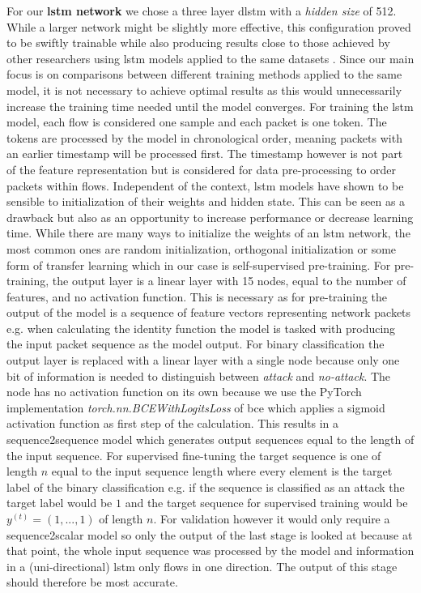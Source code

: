 For our \textbf{\gls{lstm} network} we chose a three layer \gls{dlstm} with a \textit{hidden size} of 512. While a larger network might be slightly more effective, this configuration proved to be swiftly trainable while also producing results close to those achieved by other researchers using \gls{lstm} models applied to the same datasets \cite{fog_based_detection_survey_2020}. Since our main focus is on comparisons between different training methods applied to the same model, it is not necessary to achieve optimal results as this would unnecessarily increase the training time needed until the model converges. For training the \gls{lstm} model, each flow is considered one sample and each packet is one token. The tokens are processed by the model in chronological order, meaning packets with an earlier timestamp will be processed first. The timestamp however is not part of the feature representation but is considered for data pre-processing to order packets within flows. Independent of the context, \gls{lstm} models have shown to be sensible to initialization of their weights and hidden state. This can be seen as a drawback but also as an opportunity to increase performance or decrease learning time. While there are many ways to initialize the weights of an \gls{lstm} network, the most common ones are random initialization, orthogonal initialization or some form of transfer learning which in our case is self-supervised pre-training. For pre-training, the output layer is a linear layer with 15 nodes, equal to the number of features, and no activation function. This is necessary as for pre-training the output of the model is a sequence of feature vectors representing network packets e.g. when calculating the identity function the model is tasked with producing the input packet sequence as the model output. For binary classification the output layer is replaced with a linear layer with a single node because only one bit of information is needed to distinguish between \textit{attack} and \textit{no-attack}. The node has no activation function on its own because we use the PyTorch implementation \textit{torch.nn.BCEWithLogitsLoss} of \gls{bce} which applies a sigmoid activation function as first step of the calculation. This results in a sequence2sequence model which generates output sequences equal to the length of the input sequence. For supervised fine-tuning the target sequence is one of length $n$ equal to the input sequence length where every element is the target label of the binary classification e.g. if the sequence is classified as an attack the target label would be $1$ and the target sequence for supervised training would be $y^{(t)} = (1,...,1)$ of length $n$. For validation however it would only require a sequence2scalar model so only the output of the last stage is looked at because at that point, the whole input sequence was processed by the model and information in a (uni-directional) \gls{lstm} only flows in one direction. The output of this stage should therefore be most accurate.

